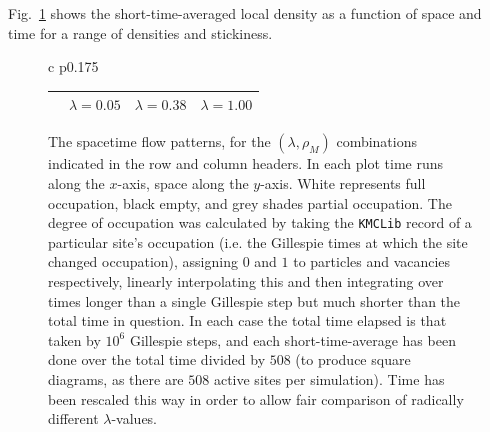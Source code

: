 \iffalse
Fig.~\ref{fig:flowPatterns} shows the short-time-averaged local density as a function of space and time for a range of densities and stickiness.
\begin{figure}[h!]
\caption{\label{fig:flowPatterns} The spacetime flow patterns, for the $(\lambda, \rho_M)$ combinations indicated in the row and column headers. In each plot time runs along the $x$-axis, space along the $y$-axis. White represents full occupation, black empty, and grey shades partial
occupation. The degree of occupation was calculated by taking the \texttt{KMCLib} record of a particular site's occupation (i.e. the Gillespie times at
which the site changed occupation), assigning $0$ and $1$ to particles and vacancies respectively, linearly interpolating this and then integrating over times longer than a single Gillespie step but much shorter than the total time in question.
In each case the total time elapsed is that taken by $10^6$ Gillespie steps, and each short-time-average has been done over the total time divided by $508$ (to produce square diagrams, as there are $508$ active sites
per simulation). Time has been rescaled this way in order to allow fair comparison of radically different $\lambda$-values.}
\begin{tabular}{c p{0.175\linewidth}}
\hspace{-2em}\begin{tabular}{c|c@{\hspace{0.25em}}c@{\hspace{0.25em}}c}
  &  $\lambda=0.05$ & $\lambda=0.38$ & $\lambda=1.00$ \\ 
  \hline

\end{tabular}
\end{tabular}
\end{figure}
